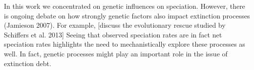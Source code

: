 \documentclass[a4paper]{scrartcl}
\begin{document}
In this work we concentrated on genetic influences on speciation.
However, there is ongoing debate on how strongly genetic factors also impact extinction processes (Jamieson 2007).
For example, [discuss the evolutionary rescue studied by Schiffers et al. 2013]
Seeing that observed speciation rates are in fact net speciation rates highlights the need to mechanistically explore
these processes as well.
In fact, genetic processes might play an important role in the issue of extinction debt. %

\printbibliography
\end{document}
